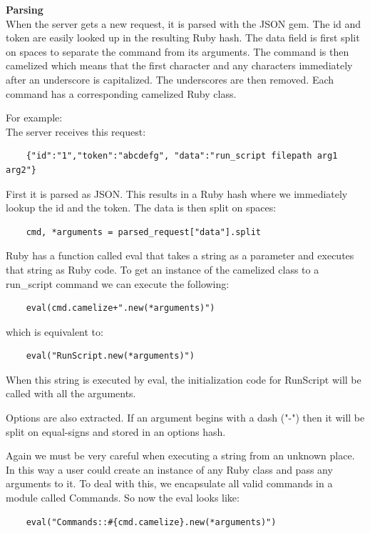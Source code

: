 \textbf{Parsing} \\
When the server gets a new request, it is parsed with the JSON gem. The id and token are easily looked up in the resulting Ruby hash. The data field is first split on spaces to separate the command from its arguments. The command is then camelized which means that the first character and any characters immediately after an underscore is capitalized. The underscores are then removed. Each command has a corresponding camelized Ruby class.

For example: \\
The server receives this request:
\begin{verbatim}
	{"id":"1","token":"abcdefg", "data":"run_script filepath arg1 arg2"}
\end{verbatim}

First it is parsed as JSON. This results in a Ruby hash where we immediately lookup the id and the token. The data is then split on spaces:

\begin{verbatim}
	cmd, *arguments = parsed_request["data"].split
\end{verbatim}

Ruby has a function called eval that takes a string as a parameter and executes that string as Ruby code. To get an instance of the camelized class to a run\_script command we can execute the following:

\begin{verbatim}
	eval(cmd.camelize+".new(*arguments)")
\end{verbatim}

which is equivalent to:

\begin{verbatim}
	eval("RunScript.new(*arguments)")
\end{verbatim}

When this string is executed by eval, the initialization code for RunScript will be called with all the arguments.

Options are also extracted. If an argument begins with a dash ("-") then it will be split on equal-signs and stored in an options hash.

Again we must be very careful when executing a string from an unknown place. In this way a user could create an instance of any Ruby class and pass any arguments to it. To deal with this, we encapsulate all valid commands in a module called Commands. So now the eval looks like:

\begin{verbatim}
	eval("Commands::#{cmd.camelize}.new(*arguments)")
\end{verbatim}

